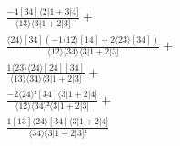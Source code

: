 \documentclass[varwidth, border=5pt]{standalone}
\begin{document}
\begin{my}
$\begin{gathered}
\scriptscriptstyle\frac{-4[34]⟨2|1+3|4]}{⟨13⟩⟨3|1+2|3]} +\\
\scriptscriptstyle\frac{⟨24⟩[34](-1⟨12⟩[14]+2⟨23⟩[34])}{⟨12⟩⟨34⟩⟨3|1+2|3]} +\\
\scriptscriptstyle\frac{1⟨23⟩⟨24⟩[24][34]}{⟨13⟩⟨34⟩⟨3|1+2|3]} +\\
\scriptscriptstyle\frac{-2⟨24⟩²[34]⟨3|1+2|4]}{⟨12⟩⟨34⟩²⟨3|1+2|3]} +\\
\scriptscriptstyle\frac{1[13]⟨24⟩[34]⟨3|1+2|4]}{⟨34⟩⟨3|1+2|3]²} \phantom{+}
\end{gathered}$
\end{my}
\end{document}
